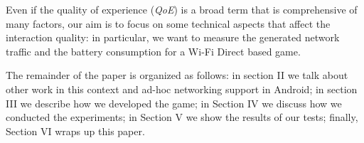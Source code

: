 Even if the quality of experience (\textit{QoE}) is a broad term that is
comprehensive of many factors\cite{bib:moeller-qoe}, our aim is to focus on
some technical aspects that affect the interaction quality: in particular, we
want to measure the generated network traffic and the battery consumption for
a Wi-Fi Direct based game.

The remainder of the paper is organized as follows: in section II we talk about
other work in this context and ad-hoc networking support in Android;
in section III we describe how we developed the game; in Section IV we discuss
how we conducted the experiments; in Section V we show the results of our tests;
finally, Section VI wraps up this paper.
